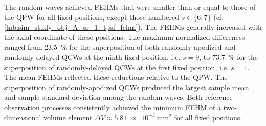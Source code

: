 The random waves achieved
\acp{FEHM} that were
smaller than or
equal to
those of
the \ac{QPW} for
all fixed positions, except
those numbered
$s \in \{ 6, 7 \}$
(cf. \cref{tab:sim_study_obj_A_sr_1_tpsf_fehm}).
The \acp{FEHM} generally increased with
the axial coordinate of
these positions.
The maximum normalized differences ranged from
\SI{23.5}{\percent} for
the superposition of both
randomly-apodized and
randomly-delayed \acp{QCW} at
the ninth fixed position, i.e.
$s = 9$, to
\SI{73.7}{\percent} for
the superposition of
randomly-delayed \acp{QCW} at
the first fixed position, i.e.
$s = 1$.
The mean \acp{FEHM} reflected
these reductions relative to
the \ac{QPW}.
The superposition of
randomly-apodized \acp{QCW} produced
the largest sample mean and
sample standard deviation among
the random waves.
Both reference observation processes consistently achieved
the minimum \ac{FEHM} of
a two-dimensional volume element
$\Delta V \approx \SI{5.81e-3}{\milli\meter\squared}$ for
all fixed positions.


